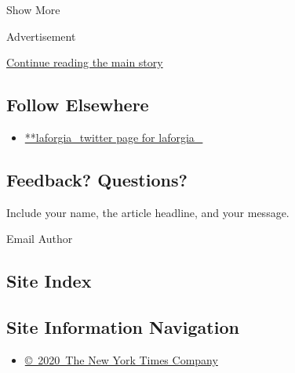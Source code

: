 Show More

Advertisement

\protect\hyperlink{after-mid2}{Continue reading the main story}

\hypertarget{follow-elsewhere}{%
\subsection{Follow Elsewhere}\label{follow-elsewhere}}

\begin{itemize}
\tightlist
\item
  \href{https://twitter.com/laforgia_}{**laforgia\_twitter page for
  laforgia\_}
\end{itemize}

\hypertarget{feedback-questions}{%
\subsection{Feedback? Questions?}\label{feedback-questions}}

Include your name, the article headline, and your message.

Email Author

\hypertarget{site-index}{%
\subsection{Site Index}\label{site-index}}

\hypertarget{site-information-navigation}{%
\subsection{Site Information
Navigation}\label{site-information-navigation}}

\begin{itemize}
\tightlist
\item
  \href{https://help.nytimes.com/hc/en-us/articles/115014792127-Copyright-notice}{©~2020~The
  New York Times Company}
\end{itemize}

